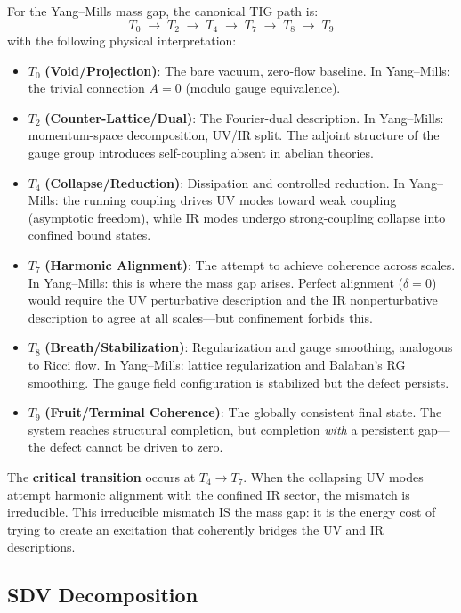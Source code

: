 \documentclass[11pt]{article}
\begin{document}
For the Yang--Mills mass gap, the canonical TIG path is:
\begin{equation}\label{eq:tig-path}
  T_0 \;\to\; T_2 \;\to\; T_4 \;\to\; T_7 \;\to\; T_8 \;\to\; T_9
\end{equation}
with the following physical interpretation:
\begin{itemize}
  \item $T_0$ \textbf{(Void/Projection)}: The bare vacuum, zero-flow
    baseline.  In Yang--Mills: the trivial connection $A = 0$ (modulo
    gauge equivalence).
  \item $T_2$ \textbf{(Counter-Lattice/Dual)}: The Fourier-dual
    description.  In Yang--Mills: momentum-space decomposition,
    UV/IR split.  The adjoint structure of the gauge group introduces
    self-coupling absent in abelian theories.
  \item $T_4$ \textbf{(Collapse/Reduction)}: Dissipation and controlled
    reduction.  In Yang--Mills: the running coupling drives UV modes
    toward weak coupling (asymptotic freedom), while IR modes undergo
    strong-coupling collapse into confined bound states.
  \item $T_7$ \textbf{(Harmonic Alignment)}: The attempt to achieve
    coherence across scales.  In Yang--Mills: this is where the mass
    gap arises.  Perfect alignment ($\delta = 0$) would require the
    UV perturbative description and the IR nonperturbative description
    to agree at all scales---but confinement forbids this.
  \item $T_8$ \textbf{(Breath/Stabilization)}: Regularization and gauge
    smoothing, analogous to Ricci flow.  In Yang--Mills: lattice
    regularization and Balaban's RG smoothing.  The gauge field
    configuration is stabilized but the defect persists.
  \item $T_9$ \textbf{(Fruit/Terminal Coherence)}: The globally consistent
    final state.  The system reaches structural completion, but
    completion \emph{with} a persistent gap---the defect cannot be
    driven to zero.
\end{itemize}

The \textbf{critical transition} occurs at $T_4 \to T_7$.  When the
collapsing UV modes attempt harmonic alignment with the confined IR
sector, the mismatch is irreducible.  This irreducible mismatch IS
the mass gap: it is the energy cost of trying to create an excitation
that coherently bridges the UV and IR descriptions.

\subsection{SDV Decomposition}
\end{document}
